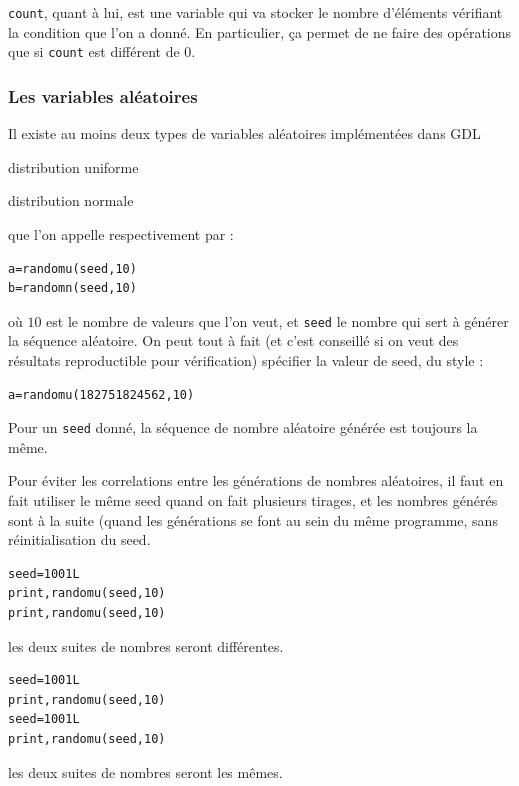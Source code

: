 \documentclass[a4paper,twoside]{article}
\begin{document}
\texttt{count}, quant à lui, est une variable qui va stocker le nombre d'éléments vérifiant la condition que l'on a donné. En particulier, ça permet de ne faire des opérations que si \texttt{count} est différent de 0.

\subsubsection{Les variables aléatoires}
Il existe au moins deux types de variables aléatoires implémentées dans GDL
\begin{enuminline}
\item distribution uniforme
\item distribution normale
\end{enuminline}
que l'on appelle respectivement par :
\begin{verbatim}
a=randomu(seed,10)
b=randomn(seed,10)
\end{verbatim}
où $10$ est le nombre de valeurs que l'on veut, et \texttt{seed} le nombre qui sert à générer la séquence aléatoire. On peut tout à fait (et c'est conseillé si on veut des résultats reproductible pour vérification) spécifier la valeur de seed, du style :
\begin{verbatim}
a=randomu(182751824562,10)
\end{verbatim}

\begin{remarque}
Pour un \texttt{seed} donné, la séquence de nombre aléatoire générée est toujours la même.
\end{remarque}

Pour éviter les correlations entre les générations de nombres aléatoires, il faut en fait utiliser le même seed quand on fait plusieurs tirages, et les nombres générés sont à la suite (quand les générations se font au sein du même programme, sans réinitialisation du seed.

\begin{exemple}
\begin{verbatim}
seed=1001L
print,randomu(seed,10)
print,randomu(seed,10)
\end{verbatim}
les deux suites de nombres seront différentes.

\bigskip

\begin{verbatim}
seed=1001L
print,randomu(seed,10)
seed=1001L
print,randomu(seed,10)
\end{verbatim}
les deux suites de nombres seront les mêmes.
\end{exemple}
\end{document}
